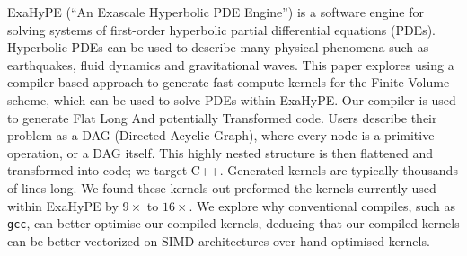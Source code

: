 ExaHyPE (``An Exascale Hyperbolic PDE Engine'') is a software engine for solving systems of first-order hyperbolic partial differential equations (PDEs).
Hyperbolic PDEs can be used to describe many physical phenomena such as earthquakes, fluid dynamics and gravitational waves.
This paper explores using a compiler based approach to generate fast compute kernels for the Finite Volume scheme, which can be used to solve PDEs within ExaHyPE.
Our compiler \phlat is used to generate Flat Long And potentially Transformed code.
Users describe their problem as a DAG (Directed Acyclic Graph), where every node is a primitive operation, or a DAG itself.
This highly nested structure is then flattened and transformed into code; we target C++.
Generated kernels are typically thousands of lines long.
We found these kernels out preformed the kernels currently used within ExaHyPE by $9\times$ to $16\times$.
We explore why conventional compiles, such as \texttt{gcc}, can better optimise our compiled kernels, deducing that our compiled kernels can be better vectorized on SIMD architectures over hand optimised kernels.
